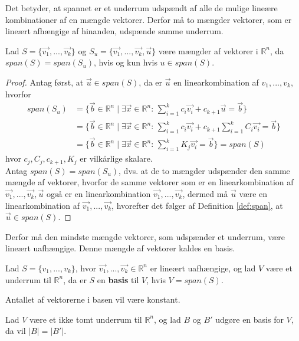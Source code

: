 Det betyder, at spannet er et underrum udspændt af alle de mulige lineære kombinationer af en mængde vektorer. 
Derfor må to mængder vektorer, som er lineært afhængige af hinanden, udspænde samme underrum.
\begin{stn}
Lad $S = \{\vec{v_1},...,\vec{v_k}\}$ og $S_u = \{\vec{v_1},...,\vec{v_k}, \vec{u}\}$ være mængder af vektorer i $\mathds{R}^n$, da $span(S) = span(S_u)$, hvis og kun hvis $u \in span(S)$.
\label{stn:akvivalentespan}
\end{stn}
\begin{proof}
Antag først, at $\vec{u} \in span(S)$, da er $\vec{u}$ en linearkombination af $v_1,..., v_k$, hvorfor
\begin{align*}
span(S_u) &= \{ \vec{b} \in \mathds{R}^n\mid \exists \vec{x} \in \mathds{R}^n: \, \sum_{i=1}^k c_i \vec{v_i} + c_{k+1} \vec{u}  =\vec{b}\}
\\&= \{ \vec{b} \in \mathds{R}^n\mid \exists \vec{x} \in \mathds{R}^n: \, \sum_{i=1}^k c_i \vec{v_i} + c_{k+1} \sum_{i=1}^k C_i \vec{v_i} = \vec{b}\}
\\&= \{ \vec{b} \in \mathds{R}^n\mid \exists \vec{x} \in \mathds{R}^n: \, \sum_{i=1}^k K_j \vec{v_i} = \vec{b}\} = span(S)
\end{align*}
hvor $c_j, C_j, c_{k+1}, K_j$ er vilkårlige skalare.
\\ Antag $span(S) = span(S_u)$, dvs. at de to mængder udspænder den samme mængde af vektorer, hvorfor de samme vektorer som er en linearkombination af $\vec{v_1},...,\vec{v_k}, \vec{u}$ også er en linearkombination $\vec{v_1},..., \vec{v_k}$, dermed må $\vec{u}$ være en linearkombination af  $\vec{v_1},..., \vec{v_k}$, hvorefter det følger af Definition \ref{def:span}, at $\vec{u} \in span(S)$.
\end{proof}
Derfor må den mindste mængde vektorer, som udspænder et underrum, være lineært uafhængige.
Denne mængde af vektorer kaldes en basis.
\begin{defn}[Basis]
Lad $S =\{v_1,...,v_k\}$, hvor $\vec{v_1},...,\vec{v_k} \in \mathds{R}^n$ er lineært uafhængige, og lad $V$ være et underrum til $\mathds{R}^n$, da er $S$ en \textbf{basis} til $V$, hvis $V = span(S)$.
\label{def:basis}
\end{defn}
Antallet af vektorerne i basen vil være konstant.
\begin{stn}
Lad $V$ være et ikke tomt underrum til $\mathds{R}^n$, og lad $B$ og $B'$ udgøre en basis for $V$, da vil $|B|=|B'|$.
\label{stn:basiskardinalitet}
\end{stn}

